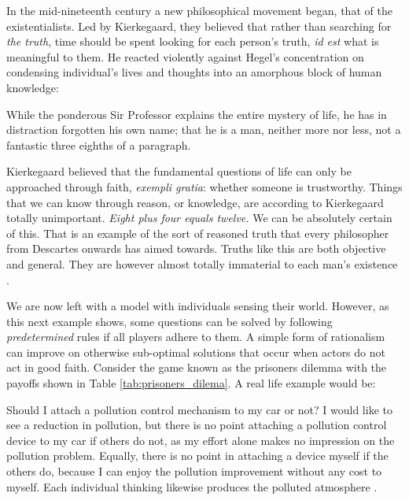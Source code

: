 In the mid-nineteenth century a new philosophical movement began, that of the existentialists. Led by Kierkegaard, they believed that rather than searching for \textit{the truth}, time should be spent looking for each person's truth, \textit{id est} what is meaningful to them. He reacted violently against Hegel's concentration on condensing individual's lives and thoughts into an amorphous block of human knowledge:

\begin{displayquote}
While the ponderous Sir Professor explains the entire mystery of life, he has in distraction forgotten his own name; that he is a man, neither more nor less, not a fantastic three eighths of a paragraph.
\end{displayquote}

Kierkegaard believed that the fundamental questions of life can only be approached through faith, \textit{exempli gratia}: whether someone is trustworthy. Things that we can know through reason, or knowledge, are according to Kierkegaard totally unimportant. \textit{Eight plus four equals twelve.} We can be absolutely certain of this. That is an example of the sort of reasoned truth that every philosopher from Descartes onwards has aimed towards. Truths like this are both objective and general. They are however almost totally immaterial to each man's existence \cite{Kierkegaard:1844}.



We are now left with a model with individuals sensing their world. However, as this next example shows, some questions can be solved by following \textit{predetermined} rules if all players adhere to them. A simple form of rationalism can improve on otherwise sub-optimal solutions that occur when actors do not act in good faith. Consider the game known as the prisoners dilemma with the payoffs shown in Table \ref{tab:prisoners_dilema}. A real life example would be:

\begin{displayquote}
Should I attach a pollution control mechanism to my car or not? I would like to see a reduction in pollution, but there is no point attaching a pollution control device to my car if others do not, as my effort alone makes no impression on the pollution problem. Equally, there is no point in attaching a device myself if the others do, because I can enjoy the pollution improvement without any cost to myself. Each individual thinking likewise produces the polluted atmosphere \cite{Hargreaves:1989}.
\end{displayquote}

